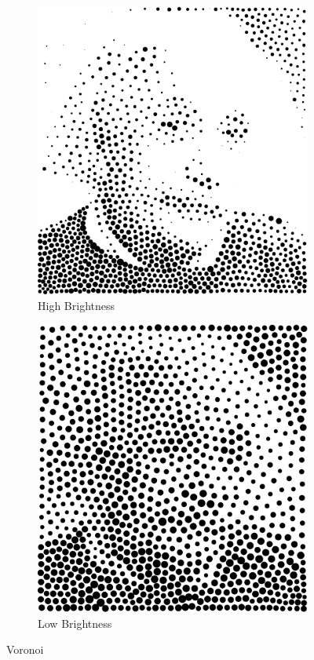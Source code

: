 \documentclass[11pt]{article}
\begin{document}
\begin{enumerate}
\begin{figure}[H]
    \centering
        \begin{subfigure}{0.4\textwidth}
        \centering
        \includegraphics[width=\textwidth]{../results/voronoi/3-3.pdf}
 \caption{High Brightness}
    \end{subfigure}
    \begin{subfigure}{0.4\textwidth}
        \centering
        \includegraphics[width=\textwidth]{../results/voronoi/3-4.pdf}
 \caption{Low Brightness}
    \end{subfigure}
    \caption{Voronoi}
    \label{fig:2}
\end{figure}


\end{enumerate}
\end{document}
